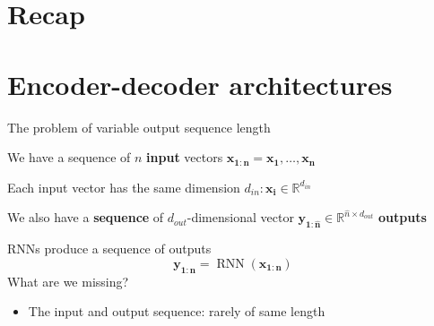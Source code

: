 \documentclass[12pt,aspectratio=169,handout]{beamer}
\DeclareMathOperator*{\rnn}{RNN}
\begin{document}
\section*{Recap}

%
%
%
%



\section{Encoder-decoder architectures}

\begin{frame}{The problem of variable output sequence length}


We have a sequence of $n$ \textbf{input} vectors $\bm{x_{1:n}} = \bm{x_1}, \ldots, \bm{x_n}$

Each input vector has the same dimension $d_{in}: \bm{x_i} \in \mathbb{R}^{d_{in}}$

\bigskip

\pause
We also have a \textbf{sequence} of $d_{out}$-dimensional vector $\bm{y_{1:\hat{n}}} \in \mathbb{R}^{\hat{n} \times d_{out}}$ \textbf{outputs} 

\bigskip

\pause
RNNs produce a sequence of outputs %
	$$
	\bm{y_{1:n}} = \rnn (\bm{x_{1:n}})
	$$
	What are we missing?
	\pause
	\begin{itemize}
		\item The input and output sequence: rarely of same length 
	\end{itemize}

\end{frame}
\end{document}
